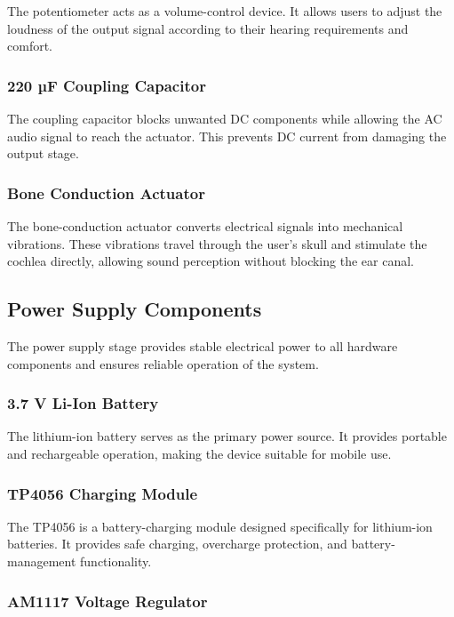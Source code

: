 The potentiometer acts as a volume-control device. It allows users to adjust the loudness of the output signal according to their hearing requirements and comfort.

\subsubsection{220 µF Coupling Capacitor}

The coupling capacitor blocks unwanted DC components while allowing the AC audio signal to reach the actuator. This prevents DC current from damaging the output stage.

\subsubsection{Bone Conduction Actuator}

The bone-conduction actuator converts electrical signals into mechanical vibrations. These vibrations travel through the user's skull and stimulate the cochlea directly, allowing sound perception without blocking the ear canal.
\subsection{Power Supply Components}
The power supply stage provides stable electrical power to all hardware components and ensures reliable operation of the system.

\subsubsection{3.7 V Li-Ion Battery}

The lithium-ion battery serves as the primary power source. It provides portable and rechargeable operation, making the device suitable for mobile use.

\subsubsection{TP4056 Charging Module}

The TP4056 is a battery-charging module designed specifically for lithium-ion batteries. It provides safe charging, overcharge protection, and battery-management functionality.

\subsubsection{AM1117 Voltage Regulator}

